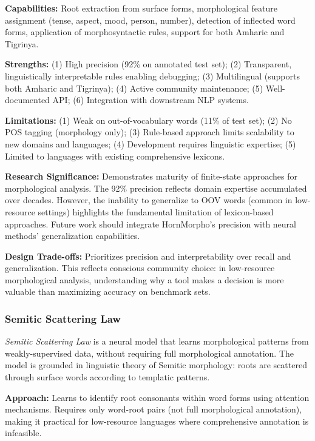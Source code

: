 \documentclass[12pt,a4paper]{article}
\theoremstyle{plain}
\theoremstyle{definition}
\newcommand{\tooldesc}[1]{{\textit{#1}}}
\begin{document}
\textbf{Capabilities:} Root extraction from surface forms, morphological feature assignment (tense, aspect, mood, person, number), detection of inflected word forms, application of morphosyntactic rules, support for both Amharic and Tigrinya.

\textbf{Strengths:} (1) High precision (92\% on annotated test set); (2) Transparent, linguistically interpretable rules enabling debugging; (3) Multilingual (supports both Amharic and Tigrinya); (4) Active community maintenance; (5) Well-documented API; (6) Integration with downstream NLP systems.

\textbf{Limitations:} (1) Weak on out-of-vocabulary words (11\% of test set); (2) No POS tagging (morphology only); (3) Rule-based approach limits scalability to new domains and languages; (4) Development requires linguistic expertise; (5) Limited to languages with existing comprehensive lexicons.

\textbf{Research Significance:} Demonstrates maturity of finite-state approaches for morphological analysis. The 92\% precision reflects domain expertise accumulated over decades. However, the inability to generalize to OOV words (common in low-resource settings) highlights the fundamental limitation of lexicon-based approaches. Future work should integrate HornMorpho's precision with neural methods' generalization capabilities.

\textbf{Design Trade-offs:} Prioritizes precision and interpretability over recall and generalization. This reflects conscious community choice: in low-resource morphological analysis, understanding why a tool makes a decision is more valuable than maximizing accuracy on benchmark sets.

\subsubsection{Semitic Scattering Law}

\tooldesc{Semitic Scattering Law} is a neural model that learns morphological patterns from weakly-supervised data, without requiring full morphological annotation. The model is grounded in linguistic theory of Semitic morphology: roots are scattered through surface words according to templatic patterns.

\textbf{Approach:} Learns to identify root consonants within word forms using attention mechanisms. Requires only word-root pairs (not full morphological annotation), making it practical for low-resource languages where comprehensive annotation is infeasible.
\end{document}
